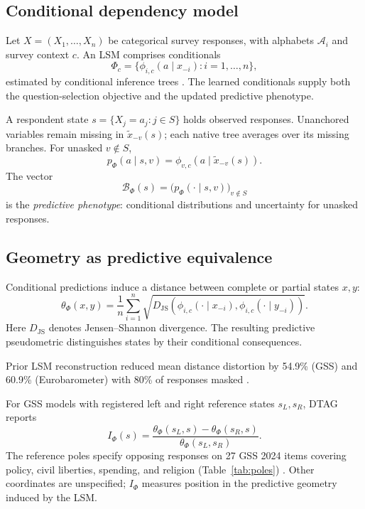 \documentclass[technote,10pt]{IEEEtran}
\newcommand{\calB}{\mathcal{B}}
\newcommand{\JS}{D_{\mathrm{JS}}}
\newcommand{\Ph}{\Phi}
\begin{document}
\subsection{Conditional dependency model}
Let $X=(X_1,\ldots,X_n)$ be categorical survey responses, with alphabets $\mathcal A_i$ and survey context $c$. An LSM comprises conditionals
\begin{equation}
\Ph_c=\{\phi_{i,c}(a\mid x_{-i}) : i=1,\ldots,n\},
\label{eq:lsm}
\end{equation}
estimated by conditional inference trees \cite{hothorn2006,sizemore2024,dahal2026}. The learned conditionals supply both the question-selection objective and the updated predictive phenotype.

A respondent state $s=\{X_j=a_j:j\in S\}$ holds observed responses. Unanchored variables remain missing in $\widetilde x_{-v}(s)$; each native tree averages over its missing branches. For unasked $v\notin S$,
\begin{equation}
p_\Ph(a\mid s,v)=\phi_{v,c}(a\mid\widetilde x_{-v}(s)).
\label{eq:predict}
\end{equation}
The vector
\begin{equation}
\calB_\Ph(s)=\bigl(p_\Ph(\cdot\mid s,v)\bigr)_{v\notin S}
\label{eq:beliefstate}
\end{equation}
is the \emph{predictive phenotype}: conditional distributions and uncertainty for unasked responses.

\subsection{Geometry as predictive equivalence}
Conditional predictions induce a distance between complete or partial states $x,y$:
\begin{equation}
\theta_\Ph(x,y)=\frac{1}{n}\sum_{i=1}^n
\sqrt{\JS\!\left(
\phi_{i,c}(\cdot\mid x_{-i}),\phi_{i,c}(\cdot\mid y_{-i})
\right)}.
\label{eq:metric}
\end{equation}
Here $\JS$ denotes Jensen--Shannon divergence. The resulting predictive pseudometric distinguishes states by their conditional consequences.

Prior LSM reconstruction reduced mean distance distortion by 54.9\% (GSS) and 60.9\% (Eurobarometer) with 80\% of responses masked \cite{dahal2026}.

For GSS models with registered left and right reference states $s_L,s_R$, DTAG reports
\begin{equation}
I_\Ph(s)=\frac{\theta_\Ph(s_L,s)-\theta_\Ph(s_R,s)}
{\theta_\Ph(s_L,s_R)}.
\label{eq:ideology}
\end{equation}
The reference poles specify opposing responses on 27 GSS 2024 items covering policy, civil liberties, spending, and religion (Table~\ref{tab:poles}) \cite{dahal2026}. Other coordinates are unspecified; $I_\Ph$ measures position in the predictive geometry induced by the LSM.
\end{document}
